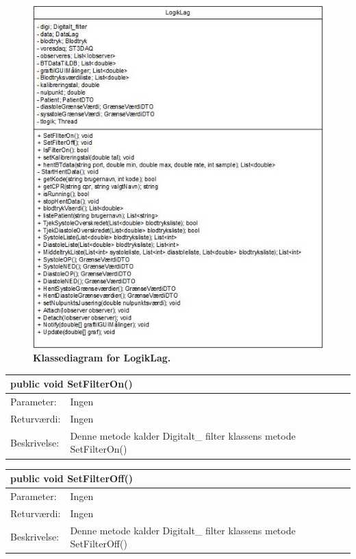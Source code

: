 \begin{figure}[H]
\includegraphics[width =1.0\textwidth , center]{billeder/klassediagramLogik}
\caption{\textbf{Klassediagram for LogikLag.}}
\end{figure}
\begin{table}[H]
\label{tab:tabel2}
\begin{tabular}{| l | p{13cm} |}
   \hline
   \multicolumn{2}{|l|}{public void SetFilterOn()} \\ \hline
   Parameter: & Ingen\\ \hline
   Returværdi: & Ingen\\ \hline
   Beskrivelse: & Denne metode kalder Digitalt\_ filter klassens metode SetFilterOn() \\ \hline
\end{tabular}
\end{table}
\begin{table}[H]
\label{tab:tabel2}
\begin{tabular}{| l | p{13cm} |}
   \hline
   \multicolumn{2}{|l|}{public void SetFilterOff()} \\ \hline
   Parameter: & Ingen\\ \hline
   Returværdi: & Ingen\\ \hline
   Beskrivelse: & Denne metode kalder Digitalt\_ filter klassens metode SetFilterOff() \\ \hline
\end{tabular}
\end{table}
